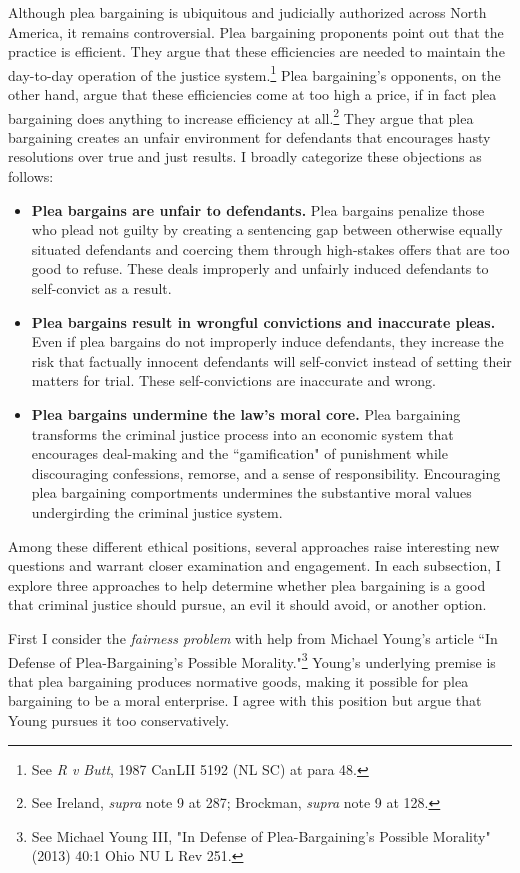 Although plea bargaining is ubiquitous and judicially authorized across North America, it remains controversial. Plea bargaining proponents point out that the practice is efficient. They argue that these efficiencies are needed to maintain the day-to-day operation of the justice system.\footnote{See \textit{R v Butt}, 1987 CanLII 5192 (NL SC) at para 48.} Plea bargaining's opponents, on the other hand, argue that these efficiencies come at too high a price, if in fact plea bargaining does anything to increase efficiency at all.\footnote{See Ireland, \textit{supra} note 9 at 287; Brockman, \textit{supra} note 9 at 128.} They argue that plea bargaining creates an unfair environment for defendants that encourages hasty resolutions over true and just results. I broadly categorize these objections as follows:

\begin{itemize}
    \item \textbf{Plea bargains are unfair to defendants.} Plea bargains penalize those who plead not guilty by creating a sentencing gap between otherwise equally situated defendants and coercing them through high-stakes offers that are too good to refuse. These deals improperly and unfairly induced defendants to self-convict as a result.
    \item \textbf{Plea bargains result in wrongful convictions and inaccurate pleas.} Even if plea bargains do not improperly induce defendants, they increase the risk that factually innocent defendants will self-convict instead of setting their matters for trial. These self-convictions are inaccurate and wrong.
    \item \textbf{Plea bargains undermine the law's moral core.} Plea bargaining transforms the criminal justice process into an economic system that encourages deal-making and the ``gamification" of punishment while discouraging confessions, remorse, and a sense of responsibility. Encouraging plea bargaining comportments undermines the substantive moral values undergirding the criminal justice system.
\end{itemize}
Among these different ethical positions, several approaches raise interesting new questions and warrant closer examination and engagement. In each subsection, I explore three approaches to help determine whether plea bargaining is a good that criminal justice should pursue, an evil it should avoid, or another option. 

First I consider the \textit{fairness problem} with help from Michael Young's article ``In Defense of Plea-Bargaining's Possible Morality."\footnote{See Michael Young III, "In Defense of Plea-Bargaining's Possible Morality" (2013) 40:1 Ohio NU L Rev 251.} Young's underlying premise is that plea bargaining produces normative goods, making it possible for plea bargaining to be a moral enterprise. I agree with this position but argue that Young pursues it too conservatively. 

